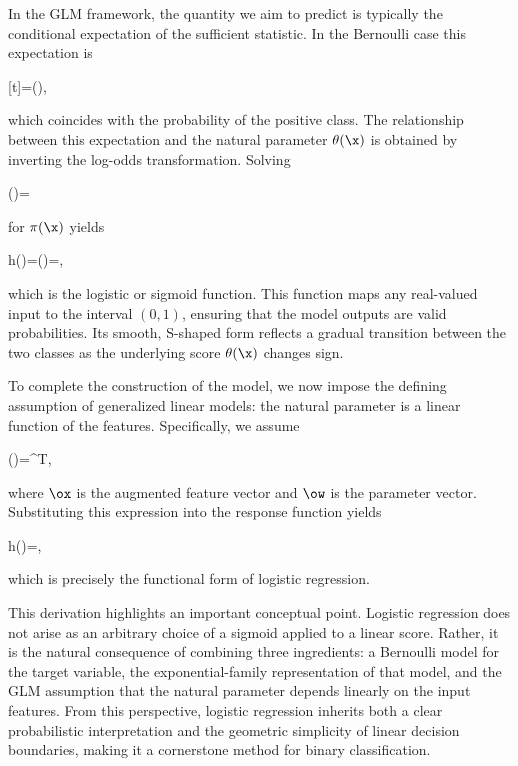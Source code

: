 \medskip
In the GLM framework, the quantity we aim to predict is typically the conditional expectation of the sufficient statistic. In the Bernoulli case this expectation is
\begin{myequation}
[t\mid\x]=\pi(\x),
\end{myequation}
which coincides with the probability of the positive class. The relationship between this expectation and the natural parameter $\theta(\x)$ is obtained by inverting the log-odds transformation. Solving
\begin{myequation}
\theta(\x)=\log{}
\end{myequation}
for $\pi(\x)$ yields
\begin{myequation}
h(\x)=\pi(\x)=,
\end{myequation}
which is the \alert{logistic} or \alert{sigmoid} function. This function maps any real-valued input to the interval $(0,1)$, ensuring that the model outputs are valid probabilities. Its smooth, S-shaped form reflects a gradual transition between the two classes as the underlying score $\theta(\x)$ changes sign.

\medskip
To complete the construction of the model, we now impose the defining assumption of generalized linear models: the natural parameter is a linear function of the features. Specifically, we assume
\begin{myequation}
\theta(\x)=\ow^{T}\ox,
\end{myequation}
where $\ox$ is the augmented feature vector and $\ow$ is the parameter vector. Substituting this expression into the response function yields
\begin{myequation}
h(\x)=,
\end{myequation}
which is precisely the functional form of \alert{logistic regression}.

This derivation highlights an important conceptual point. Logistic regression does not arise as an arbitrary choice of a sigmoid applied to a linear score. Rather, it is the natural consequence of combining three ingredients: a Bernoulli model for the target variable, the exponential-family representation of that model, and the GLM assumption that the natural parameter depends linearly on the input features. From this perspective, logistic regression inherits both a clear probabilistic interpretation and the geometric simplicity of linear decision boundaries, making it a cornerstone method for binary classification.


